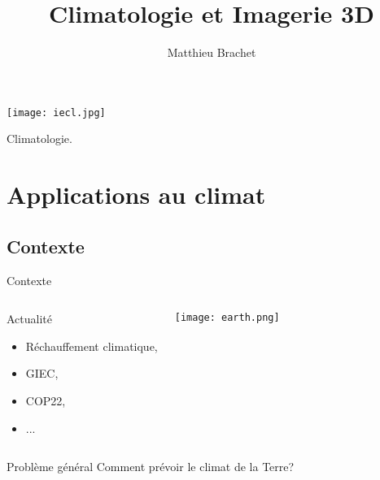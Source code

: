 \documentclass[11pt]{beamer}
\author{Matthieu Brachet}
\title{Climatologie et Imagerie 3D}
\begin{document}
\begin{frame}
\titlepage
\texttt{[image: iecl.jpg]}
\end{frame}

\begin{frame}
\tableofcontents
\end{frame}

\begin{frame}
\begin{center}
Climatologie.
\end{center}
\end{frame}

\section{Applications au climat}
\subsection{Contexte}
\begin{frame}{Contexte}
\begin{columns}
\begin{block}{Actualité}
\begin{itemize}
\item Réchauffement climatique,
\item GIEC,
\item COP22,
\item ...
\end{itemize}
\end{block}

\begin{center}
\texttt{[image: earth.png]}
\end{center}
\end{columns}

\begin{block}{Problème général}
Comment prévoir le climat de la Terre?
\end{block}
\end{frame}
\end{document}
